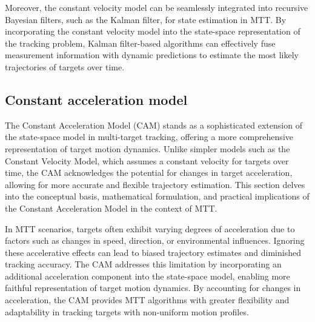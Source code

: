 Moreover, the constant velocity model can be seamlessly integrated into recursive Bayesian filters, such as the Kalman filter, for state estimation in MTT. By incorporating the constant velocity model into the state-space representation of the tracking problem, Kalman filter-based algorithms can effectively fuse measurement information with dynamic predictions to estimate the most likely trajectories of targets over time.
    \subsection{Constant acceleration model}
The Constant Acceleration Model (CAM) stands as a sophisticated extension of the state-space model in multi-target
tracking, offering a more comprehensive representation of target motion dynamics. Unlike simpler models such as the Constant Velocity Model, which assumes a constant velocity for targets over time, the CAM acknowledges the potential for changes in target acceleration, allowing for more accurate and flexible trajectory estimation. This section delves into the conceptual basis, mathematical formulation, and practical implications of the Constant Acceleration Model in the context of MTT.

In MTT scenarios, targets often exhibit varying degrees of acceleration due to factors such as changes in speed,
direction, or environmental influences. Ignoring these accelerative effects can lead to biased trajectory estimates and diminished tracking accuracy. The CAM addresses this limitation by incorporating an additional acceleration component into the state-space model, enabling more faithful representation of target motion dynamics. By accounting for changes in acceleration, the CAM provides MTT algorithms with greater flexibility and adaptability in tracking targets with non-uniform motion profiles.

